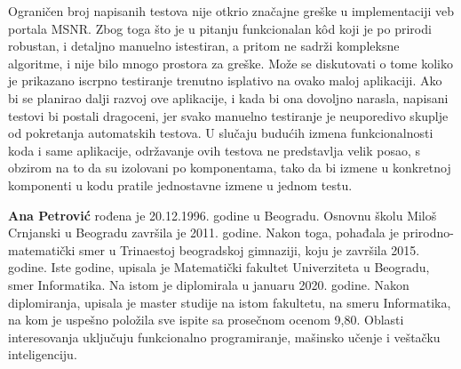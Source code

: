 \documentclass[12pt,oneside]{memoir}
\begin{document}
\par Ograničen broj napisanih testova nije otkrio značajne greške u implementaciji veb portala MSNR. Zbog toga što je u pitanju funkcionalan k\^{o}d koji je po prirodi robustan, i detaljno manuelno istestiran, a pritom ne sadrži kompleksne algoritme, i nije bilo mnogo prostora za greške. Može se diskutovati o tome koliko je prikazano iscrpno testiranje trenutno isplativo na ovako maloj aplikaciji. Ako bi se planirao dalji razvoj ove aplikacije, i kada bi ona dovoljno narasla, napisani testovi bi postali dragoceni, jer svako manuelno testiranje je neuporedivo skuplje od pokretanja automatskih testova. U slučaju budućih izmena funkcionalnosti koda i same aplikacije, održavanje ovih testova ne predstavlja velik posao, s obzirom na to da su izolovani po komponentama, tako da bi izmene u konkretnoj komponenti u kodu pratile jednostavne izmene u jednom testu.





\literatura

\backmatter

\begin{biografija}
\textbf{Ana Petrović} rođena je 20.12.1996. godine u Beogradu. Osnovnu školu Miloš Crnjanski u Beogradu završila je 2011. godine. Nakon toga, pohađala je prirodno-matematički smer u Trinaestoj beogradskoj gimnaziji, koju je završila 2015. godine. Iste godine, upisala je Matematički fakultet Univerziteta u Beogradu, smer Informatika. Na istom je diplomirala u januaru 2020. godine. Nakon diplomiranja, upisala je master studije na istom fakultetu, na smeru Informatika, na kom je uspešno položila sve ispite sa prosečnom ocenom 9,80. Oblasti interesovanja uključuju funkcionalno programiranje, mašinsko učenje i veštačku inteligenciju.
\end{biografija}
\end{document}
